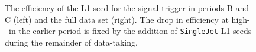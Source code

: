 \begin{figure}[htbp]
  \centering
  \caption{
    The efficiency of the L1 seed for the signal trigger in periods B and C (left) and the full data set (right). The drop in efficiency at high-\ET\ in the earlier period is fixed by the addition of \texttt{SingleJet} L1 seeds during the remainder of data-taking. 
  }
  \label{fig:l1_eff}
\end{figure}
